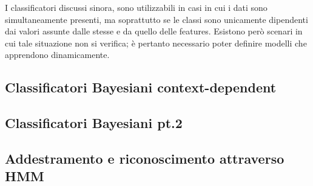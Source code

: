 \documentclass{subfiles}
\begin{document}
I classificatori discussi sinora, sono utilizzabili in casi in cui i dati sono simultaneamente presenti,
ma soprattutto se le classi sono unicamente dipendenti dai valori assunte dalle stesse e da quello delle features.
Esistono però scenari in cui tale situazione non si verifica; è pertanto necessario poter definire modelli che apprendono dinamicamente.

\subsection{Classificatori Bayesiani context-dependent}


\subsection{Classificatori Bayesiani pt.2}


\subsection{Addestramento e riconoscimento attraverso HMM}

\end{document}
